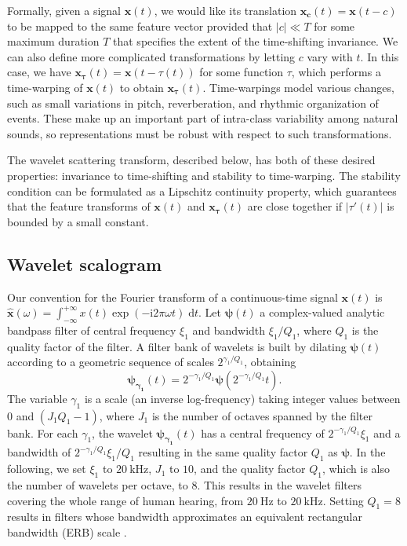 \documentclass[smallextended]{svjour3}
\begin{document}
Formally, given a signal $\boldsymbol{x}(t)$, we would like its translation $\boldsymbol{x_c}(t) = \boldsymbol{x}(t-c)$ to be mapped to the same feature vector provided that $|c| \ll T$ for some maximum duration $T$ that specifies the extent of the time-shifting invariance. We can also define more complicated transformations by letting $c$ vary with $t$. In this case, we have $\boldsymbol{x_\tau}(t) = \boldsymbol{x}(t-\tau(t))$ for some function $\tau$, which performs a time-warping of $\boldsymbol{x}(t)$ to obtain $\boldsymbol{x_\tau}(t)$. Time-warpings model various changes, such as small variations in pitch, reverberation, and rhythmic organization of events. These make up an important part of intra-class variability among natural sounds, so representations must be robust with respect to such transformations.

The wavelet scattering transform, described below, has both of these desired properties: invariance to time-shifting and stability to time-warping. The stability condition can be formulated as a Lipschitz continuity property, which guarantees that the feature transforms of $\boldsymbol{x}(t)$ and $\boldsymbol{x_\tau}(t)$ are close together if $|\tau'(t)|$ is bounded by a small constant.

\subsection{Wavelet scalogram}
Our convention for the Fourier transform of a continuous-time signal $\boldsymbol{x}(t)$ is $\boldsymbol{\hat{x}}(\omega) = \int_{-\infty}^{+\infty} x(t) \exp(- \mathrm{i} 2\pi \omega t) \; \mathrm{d}t$.
Let $\boldsymbol{\psi}(t)$ a complex-valued analytic bandpass filter of
central frequency $\xi_1$ and bandwidth $\xi_1/Q_1$, where $Q_1$ is the quality factor of the filter.
A filter bank of wavelets is built by dilating $\boldsymbol{\psi}(t)$
according to a geometric sequence of scales $2^{\gamma_1/Q_1}$, obtaining
\begin{equation}
\boldsymbol{\psi_{\gamma_1}}(t) = 2^{-\gamma_1/Q_1} \boldsymbol{\psi}(2^{-\gamma_1/Q_1} t)\mbox{.}
\end{equation}
The variable $\gamma_1$ is a scale (an inverse log-frequency) taking integer values between $0$ and $(J_1 Q_1 - 1)$, where $J_1$ is the number of octaves spanned by the filter bank.
For each $\gamma_1$, the wavelet $\boldsymbol{\psi_{\gamma_1}}(t)$
has a central frequency of $2^{-\gamma_1/Q_1}\xi_1$ and a bandwidth of $2^{-\gamma_1/Q_1}\xi_1/Q_1$ resulting in the same quality factor $Q_1$ as $\boldsymbol{\psi}$.
In the following, we set $\xi_1$ to $20~\mathrm{kHz}$, $J_1$ to $10$, and the quality factor $Q_1$, which is also the number of wavelets per octave, to $8$. This results in the wavelet filters covering the whole range of human hearing, from $20~\mathrm{Hz}$ to $20~\mathrm{kHz}$. Setting $Q_1 = 8$ results in filters whose bandwidth approximates an equivalent rectangular bandwidth (ERB) scale \cite{Fastl2007}.
\end{document}
